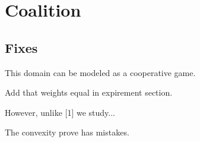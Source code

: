 \documentclass{article}
\begin{document}
\section{Coalition}

\subsection{Fixes}

This domain can be modeled as a cooperative game.

Add that weights equal in expirement section.

However, unlike [1] we study...

The convexity prove has mistakes.

%
%
\end{document}
